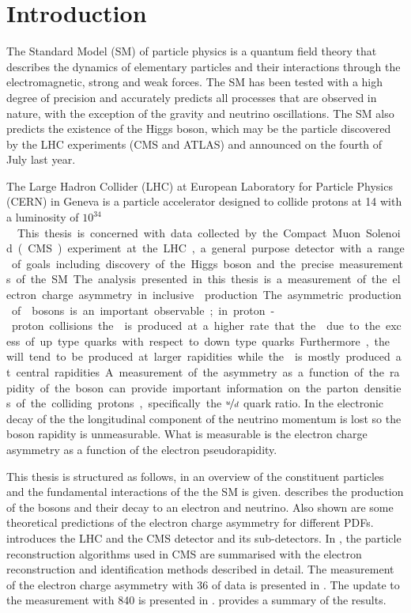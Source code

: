 \chapter{Introduction}
\label{chap:introduction}

The Standard Model (SM) of particle physics is a quantum field theory that
describes the dynamics of elementary particles and their interactions through
the electromagnetic, strong and weak forces. The {SM} has been tested with a
high degree of precision and accurately predicts all processes that are observed
in nature, with the exception of the gravity and neutrino oscillations. The {SM}
also predicts the existence of the Higgs boson, which may be the particle
discovered by the {LHC} experiments ({CMS} and {ATLAS}) and announced on the
fourth of July last year\cite{chatrchyan2012observation,aad2012observation}.

The Large Hadron Collider (LHC) at European Laboratory for Particle Physics
(CERN) in Geneva is a particle accelerator designed to collide protons at
\unit{14}{\TeV} with a luminosity of \unit{$10^{34}$}{\lumiunits}. This thesis
is concerned with data collected by the Compact Muon Solenoid (CMS) experiment at
the {LHC}, a general purpose detector with a range of goals including discovery
of the Higgs boson and the precise measurements of the {SM}.

The analysis presented in this thesis is a measurement of the electron charge
asymmetry in inclusive \PW production. The asymmetric production of \PW bosons
is an important observable; in proton-proton collisions the \PWp is  produced at
a higher rate that the \PWm due to the excess of up type quarks with respect to
down type quarks. Furthermore, the \PWp will tend to be produced at larger
rapidities while the \PWm is mostly produced at central rapidities. A
measurement of the asymmetry as a function of the rapidity of the boson can
provide important information on the parton densities of the colliding protons,
specifically the $\nicefrac{u}{d}$ quark ratio.  In the electronic decay of the
\PW the longitudinal component of the neutrino momentum is lost so the boson
rapidity is unmeasurable. What is measurable is the electron charge asymmetry as
a function of the electron pseudorapidity. 

This thesis is structured as follows, in  an overview of the
constituent particles  and the fundamental interactions of the the {SM} is given.
 describes the production of the \PW bosons and their
decay to an electron and neutrino. Also shown are some theoretical predictions
of the electron charge asymmetry for different PDFs.  
introduces the {LHC} and the {CMS} detector and its sub-detectors.  In
, the particle reconstruction algorithms used in CMS
are summarised with the electron reconstruction and identification methods
described in detail. The measurement of the electron charge asymmetry with
\unit{36}{\invpb} of data is presented in . The update
to the measurement with \unit{840}{\invpb} is presented in
.  provides a summary of
the results.




